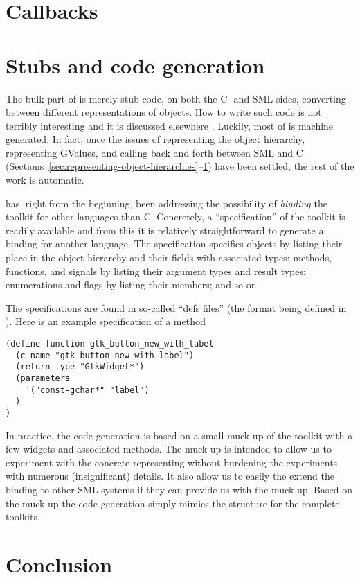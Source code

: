 \documentclass{sig-alternate}
\begin{document}

\section{Callbacks}
\label{sec:representing-callbacks}

\section{Stubs and code generation}

The bulk part of \mGTK is merely stub code, on both the C- and
SML-sides, converting between different representations of objects.
How to write such code is not terribly interesting and it is discussed
elsewhere \cite{Larsen:2001}. Luckily, most of \mGTK is machine
generated. In fact, once the issues of representing the object
hierarchy, representing GValues, and calling back and forth between
SML and C
(Sections~\ref{sec:representing-object-hierarchies}--\ref{sec:representing-callbacks})
have been settled, the rest of the work is automatic.

\Gtk has, right from the beginning, been addressing the possibility of
\emph{binding} the toolkit for other languages than C. Concretely, a
``specification'' of the toolkit is readily available and from this it
is relatively straightforward to generate a binding for another
language. The specification specifies objects by listing their place
in the object hierarchy and their fields with associated types;
methods, functions, and signals by listing their argument types and
result types; enumerations and flags by listing their members; and
so on.

The specifications are found in so-called ``defs files'' (the format
being defined in \cite{defs-format:2003}). Here is an example
specification of a method
\begin{Verbatim}
(define-function gtk_button_new_with_label
  (c-name "gtk_button_new_with_label")
  (return-type "GtkWidget*")
  (parameters
    '("const-gchar*" "label")
  )
)
\end{Verbatim}

In practice, the code generation is based on a small muck-up of the
toolkit with a few widgets and associated methods. The muck-up is
intended to allow us to experiment with the concrete representing
without burdening the experiments with numerous (insignificant)
details. It also allow us to easily the extend the binding to other
SML systems if they can provide us with the muck-up. Based on the 
muck-up the code generation simply mimics the structure for the
complete toolkits.



\section{Conclusion}





\end{document}
